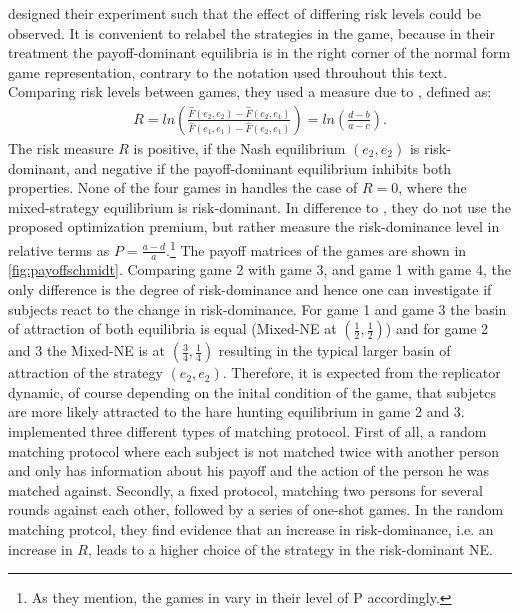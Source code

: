 \textcite{schmidt_playing_2003} designed their experiment such that the effect
of differing risk levels could be observed. It is convenient to relabel 
the strategies in the game, because in their treatment the payoff-dominant 
equilibria is in the right corner of the normal form game representation,
contrary to the notation used throuhout this text. Comparing risk levels between
games, they used a measure due to \textcite{selten_axiomatic_1995}, defined
as:
\begin{align}
        \label{riskmeasureschmidt}
        R = ln\left(\frac{\hat{F}(e_2,e_2) -\hat{F}(e_2,e_1)}{\hat{F}(e_1,e_1) 
        -\hat{F}(e_2,e_1)}\right) = ln \left(\frac{d-b}{a-c}\right).
\end{align}
The risk measure $R$ is positive, if the Nash equilibrium $(e_2,e_2)$ is
risk-dominant, and negative if the payoff-dominant equilibrium inhibits both
properties.
None of the four games in \textcite{schmidt_playing_2003} handles
the case of $R=0$, where the mixed-strategy equilibrium is risk-dominant.
In difference to \textcite{battalio_optimization_2001}, they do not
use the proposed optimization premium, but rather measure the risk-dominance 
level in relative terms as $P=\frac{a-d}{a}$.\footnote{As they mention, the 
games in \textcite{battalio_optimization_2001} vary in their level of 
P accordingly.}
The payoff matrices of the games are shown in \ref{fig:payoffschmidt}.
Comparing game 2 with game 3, and game 1 with game 4, the 
only difference is the degree of risk-dominance and hence one can 
investigate if subjects react to the change in risk-dominance. 
For game 1 and game 3 the basin of attraction of both equilibria is equal 
(Mixed-NE at $(\frac 12, \frac 12)$) and  for
game 2 and 3 the Mixed-NE is at $(\frac 34,\frac 14)$ resulting in the 
typical  larger basin of attraction of the strategy $(e_2,e_2)$. 
Therefore, it is expected from the replicator dynamic, of course 
depending on the inital condition 
of the game, that subjetcs are more likely attracted to the hare hunting 
equilibrium in game 2 and 3.
\textcite{schmidt_playing_2003} implemented three different types of matching
protocol. First of all, a random matching protocol where each subject is not
matched twice with another person and only has information 
about his payoff and the action of the person he was matched against. 
Secondly, a fixed protocol, matching two persons for several rounds against 
each other, followed by a series of one-shot games. 
In the random matching protcol, they find evidence that an increase in 
risk-dominance, i.e. an increase in $R$, leads to a higher choice of the
strategy in the risk-dominant NE. 

